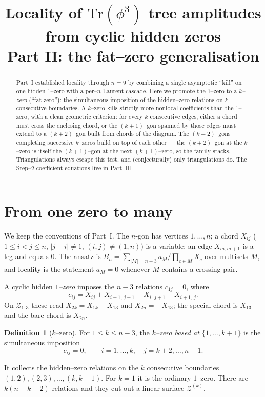 \documentclass[11pt]{article}
\title{\vspace{-1.2em}Locality of $\mathrm{Tr}(\phi^3)$ tree amplitudes from cyclic hidden zeros\\[2pt]
\large Part II: the fat--zero generalisation}
\date{}
\author{}
\theoremstyle{definition}
\newtheorem{definition}{Definition}
\newcommand{\Z}{\mathcal{Z}}
\newcommand{\X}[1]{X_{#1}}
\begin{document}
\maketitle
\vspace{-3.2em}

\begin{abstract}
\noindent Part~I established locality through $n=9$ by combining a single asymptotic
``kill'' on one hidden $1$--zero with a per--$n$ Laurent cascade. Here we promote the
$1$--zero to a \emph{$k$--zero} (``fat zero''): the simultaneous imposition of the
hidden--zero relations on $k$ consecutive boundaries. A $k$--zero kills strictly more
nonlocal coefficients than the $1$--zero, with a clean geometric criterion: for every
$k$ consecutive edges, either a chord must cross the enclosing chord, or the
$(k{+}1)$--gon spanned by those edges must extend to a $(k{+}2)$--gon built from chords
of the diagram. The $(k{+}2)$--gons completing successive $k$--zeros build on top of
each other --- the $(k{+}2)$--gon at the $k$--zero is itself the $(k{+}1)$--gon
at the next $(k{+}1)$--zero, so the family stacks. Triangulations always escape this
test, and (conjecturally) only triangulations do. The Step--$2$ coefficient
equations live in Part~III.
\end{abstract}

\section{From one zero to many}
We keep the conventions of Part~I. The $n$-gon has vertices $1,\dots,n$; a chord
$\X{ij}$ ($1\le i<j\le n$, $|j-i|\neq 1$, $(i,j)\neq(1,n)$) is a variable; an edge
$\X{m,m+1}$ is a leg and equals $0$. The ansatz is
$B_n=\sum_{|M|=n-3}a_M\big/\!\prod_{c\in M}\X{c}$ over multisets $M$, and locality is
the statement $a_M=0$ whenever $M$ contains a crossing pair.

A cyclic hidden \emph{$1$--zero} imposes the $n-3$ relations $c_{1j}=0$, where
\begin{equation}\label{eq:c}
  c_{ij}=\X{ij}+\X{i+1,\,j+1}-\X{i,\,j+1}-\X{i+1,\,j}.
\end{equation}
On $\Z_{1,3}$ these read $\X{2k}=\X{1k}-\X{13}$ and $\X{2n}=-\X{13}$; the special chord
is $\X{13}$ and the bare chord is $\X{2n}$.

\begin{definition}[$k$--zero]\label{def:kzero}
For $1\le k\le n-3$, the \emph{$k$--zero based at $\{1,\dots,k{+}1\}$} is the
simultaneous imposition
\begin{equation}\label{eq:kzero}
  c_{ij}=0,\qquad i=1,\dots,k,\quad j=k+2,\dots,n-1 .
\end{equation}
\end{definition}
\noindent It collects the hidden--zero relations on the $k$ consecutive boundaries
$(1,2),(2,3),\dots,(k,k{+}1)$. For $k=1$ it is the ordinary $1$--zero. There are
$k(n-k-2)$ relations and they cut out a linear surface $\Z^{(k)}$.
\end{document}
